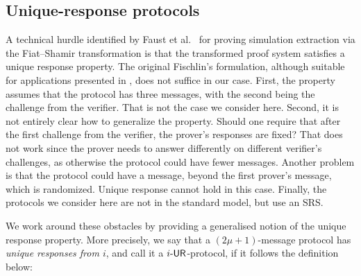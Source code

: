 \subsection{Unique-response protocols}
A technical hurdle identified by Faust et al.~\cite{INDOCRYPT:FKMV12} for proving
simulation extraction via the Fiat--Shamir transformation is that the transformed
proof system satisfies a unique response property. The original Fischlin's
formulation, although suitable for applications presented in
\cite{C:Fischlin05,INDOCRYPT:FKMV12}, does not suffice in our case. First, the
property assumes that the protocol has three messages, with the second being the
challenge from the verifier. That is not the case we consider here. Second, it is not
entirely clear how to generalize the property. Should one require that after the
first challenge from the verifier, the prover's responses are fixed?  That does not
work since the prover needs to answer differently on different verifier's challenges,
as otherwise the protocol could have fewer messages.  Another problem is that the
protocol could have a message, beyond the first prover's message, which is
randomized. Unique response cannot hold in this case. Finally, the protocols we
consider here are not in the standard model, but use an SRS.

We work around these obstacles by providing a generalised notion of the unique
response property. More precisely, we say that a $(2\mu + 1)$-message protocol
has \emph{unique responses from $i$}, and call it a ${i\text{-}\mathsf{UR}}$-protocol, if it
follows the definition below:



